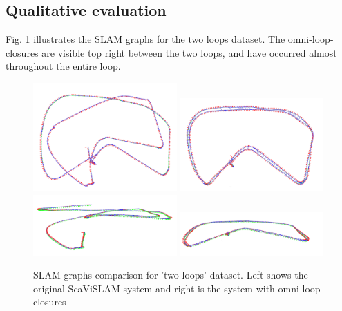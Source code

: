 \subsection{Qualitative evaluation}

Fig. \ref{fig:two_loops_quantitative} illustrates the SLAM graphs for the two loops dataset.  The omni-loop-closures are visible top right between the two loops, and have occurred almost throughout the entire loop. 

\begin{figure}[h]
  \centering
    \includegraphics[width=0.49\textwidth]{chapters/images/stereo_above}
    \includegraphics[width=0.49\textwidth]{chapters/images/omni_above}\\
    \includegraphics[width=0.49\textwidth]{chapters/images/stereo_side}
    \includegraphics[width=0.49\textwidth]{chapters/images/omni_side}
  \caption{SLAM graphs comparison for 'two loops' dataset.  Left shows the original ScaViSLAM system and right is the system with omni-loop-closures}
  \label{fig:two_loops_quantitative}
\end{figure}

